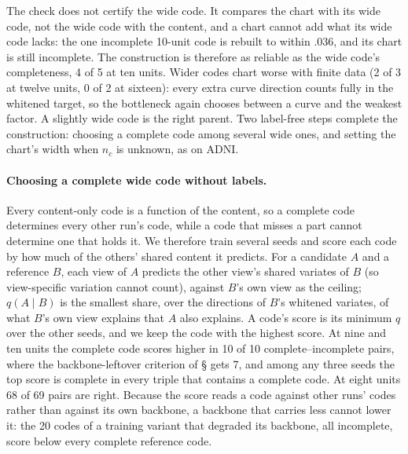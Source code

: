 The check does not certify the wide code. It compares the chart with its wide
code, not the wide code with the content, and a chart cannot add what its wide
code lacks: the one incomplete 10-unit code is rebuilt to within $.036$, and its
chart is still incomplete. The construction is therefore as reliable as the wide
code's completeness, 4 of 5 at ten units. Wider codes chart worse with finite
data (2 of 3 at twelve units, 0 of 2 at sixteen): every extra curve direction
counts fully in the whitened target, so the bottleneck again chooses between a
curve and the weakest factor. A slightly wide code is the right parent. Two
label-free steps complete the construction: choosing a complete code among
several wide ones, and setting the chart's width when $n_c$ is unknown, as on
ADNI.

\paragraph{Choosing a complete wide code without labels.} Every content-only
code is a function of the content, so a complete code determines every other
run's code, while a code that misses a part cannot determine one that holds it.
We therefore train several seeds and score each code by how much of the others'
shared content it predicts. For a candidate $A$ and a reference $B$, each view
of $A$ predicts the other view's shared variates of $B$ (so view-specific
variation cannot count), against $B$'s own view as the ceiling; $q(A \mid B)$ is
the smallest share, over the directions of $B$'s whitened variates, of what $B$'s
own view explains that $A$ also explains. A code's score is its minimum $q$ over
the other seeds, and we keep the code with the highest score. At nine and ten
units the complete code scores higher in 10 of 10 complete--incomplete pairs,
where the backbone-leftover criterion of \S{} gets 7, and among any
three seeds the top score is complete in every triple that contains a complete
code. At eight units 68 of 69 pairs are right. Because the score reads a code
against other runs' codes rather than against its own backbone, a backbone that
carries less cannot lower it: the 20 codes of a training variant that degraded
its backbone, all incomplete, score below every complete reference code.

